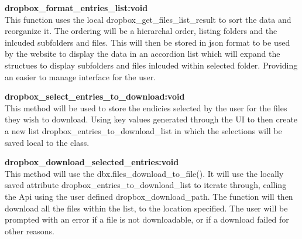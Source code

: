 \textbf{dropbox\_format\_entries\_list:void} \\
    This function uses the local dropbox\_get\_files\_list\_result to sort the data and reorganize it. The ordering will be a hierarchal order, listing 
    folders and the inlcuded subfolders and files. This will then be stored in json format to be used by the website to display the data in an
    accordion list which will expand the structues to display subfolders and files inlcuded within selected folder. Providing an easier to manage
    interface for the user.

\textbf{dropbox\_select\_entries\_to\_download:void} \\
    This method will be used to store the endicies selected by the user for the files they wish to download. Using key values generated through 
    the UI to then create a new list dropbox\_entries\_to\_download\_list in which the selections will be saved local to the class.

\textbf{dropbox\_download\_selected\_entries:void} \\
    This method will use the dbx.files\_download\_to\_file(). It will use the locally saved attribute dropbox\_entries\_to\_download\_list to
    iterate through, calling the Api using the user defined dropbox\_download\_path. The function will then download all the files within the 
    list, to the location specified. The user will be prompted with an error if a file is not downloadable, or if a download failed for other 
    reasons.

